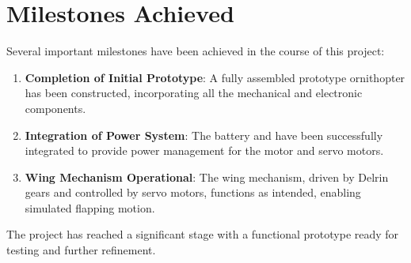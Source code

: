 \section{Milestones Achieved}
Several important milestones have been achieved in the course of this project:

\begin{enumerate}
    \item \textbf{Completion of Initial Prototype}: A fully assembled prototype ornithopter has been constructed, incorporating all the mechanical and electronic components.
    
    \item \textbf{Integration of Power System}: The \lipo battery and \esc have been successfully integrated to provide power management for the motor and servo motors.
    
    \item \textbf{Wing Mechanism Operational}: The wing mechanism, driven by Delrin gears and controlled by servo motors, functions as intended, enabling simulated flapping motion.
\end{enumerate}

The project has reached a significant stage with a functional prototype ready for testing and further refinement.